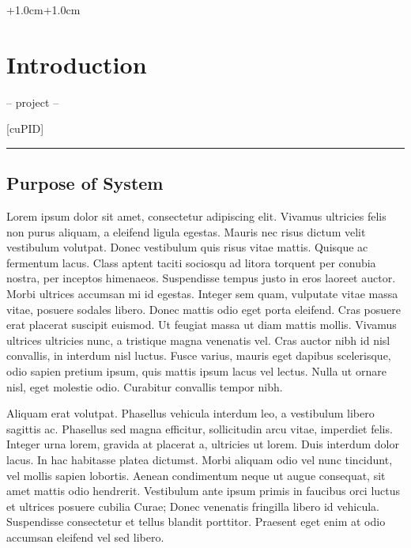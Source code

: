 \documentclass[english]{article}
\begin{document}
\begin{adjustwidth*}{+1.0cm}{+1.0cm}


\section{Introduction}

\begin{center}
-- project --
\par\end{center}

\begin{center}
{\Huge{}{[}cuPID{]}}
\par\end{center}{\Huge \par}

\rule[0.5ex]{0.83\columnwidth}{0.5pt}


\subsection{Purpose of System}

{\large{}Lorem ipsum dolor sit amet, consectetur adipiscing elit.
Vivamus ultricies felis non purus aliquam, a eleifend ligula egestas.
Mauris nec risus dictum velit vestibulum volutpat. Donec vestibulum
quis risus vitae mattis. Quisque ac fermentum lacus. Class aptent
taciti sociosqu ad litora torquent per conubia nostra, per inceptos
himenaeos. Suspendisse tempus justo in eros laoreet auctor. Morbi
ultrices accumsan mi id egestas. Integer sem quam, vulputate vitae
massa vitae, posuere sodales libero. Donec mattis odio eget porta
eleifend. Cras posuere erat placerat suscipit euismod. Ut feugiat
massa ut diam mattis mollis. Vivamus ultrices ultricies nunc, a tristique
magna venenatis vel. Cras auctor nibh id nisl convallis, in interdum
nisl luctus. Fusce varius, mauris eget dapibus scelerisque, odio sapien
pretium ipsum, quis mattis ipsum lacus vel lectus. Nulla ut ornare
nisl, eget molestie odio. Curabitur convallis tempor nibh.}{\large \par}

{\large{}Aliquam erat volutpat. Phasellus vehicula interdum leo, a
vestibulum libero sagittis ac. Phasellus sed magna efficitur, sollicitudin
arcu vitae, imperdiet felis. Integer urna lorem, gravida at placerat
a, ultricies ut lorem. Duis interdum dolor lacus. In hac habitasse
platea dictumst. Morbi aliquam odio vel nunc tincidunt, vel mollis
sapien lobortis. Aenean condimentum neque ut augue consequat, sit
amet mattis odio hendrerit. Vestibulum ante ipsum primis in faucibus
orci luctus et ultrices posuere cubilia Curae; Donec venenatis fringilla
libero id vehicula. Suspendisse consectetur et tellus blandit porttitor.
Praesent eget enim at odio accumsan eleifend vel sed libero.}{\large \par}


\end{adjustwidth*}
\end{document}
